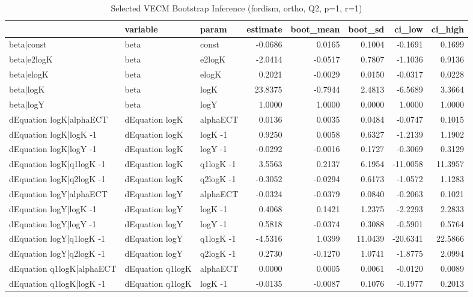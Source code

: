 \begin{table}[!h]
\centering
\caption{Selected VECM Bootstrap Inference (fordism, ortho, Q2, p=1, r=1)}
\centering
\fontsize{9}{11}\selectfont
\begin{tabular}[t]{lllrrrrr}
\toprule
  & variable & param & estimate & boot_mean & boot_sd & ci_low & ci_high\\
\midrule
beta|const & beta & const & -0.0686 & 0.0165 & 0.1004 & -0.1691 & 0.1699\\
beta|e2logK & beta & e2logK & -2.0414 & -0.0517 & 0.7807 & -1.1036 & 0.9136\\
beta|elogK & beta & elogK & 0.2021 & -0.0029 & 0.0150 & -0.0317 & 0.0228\\
beta|logK & beta & logK & 23.8375 & -0.7944 & 2.4813 & -6.5689 & 3.3664\\
beta|logY & beta & logY & 1.0000 & 1.0000 & 0.0000 & 1.0000 & 1.0000\\
\addlinespace
dEquation logK|alphaECT & dEquation logK & alphaECT & 0.0136 & 0.0035 & 0.0484 & -0.0747 & 0.1015\\
dEquation logK|logK -1 & dEquation logK & logK -1 & 0.9250 & 0.0058 & 0.6327 & -1.2139 & 1.1902\\
dEquation logK|logY -1 & dEquation logK & logY -1 & -0.0292 & -0.0016 & 0.1727 & -0.3069 & 0.3129\\
dEquation logK|q1logK -1 & dEquation logK & q1logK -1 & 3.5563 & 0.2137 & 6.1954 & -11.0058 & 11.3957\\
dEquation logK|q2logK -1 & dEquation logK & q2logK -1 & -0.3052 & -0.0294 & 0.6173 & -1.0572 & 1.1283\\
\addlinespace
dEquation logY|alphaECT & dEquation logY & alphaECT & -0.0324 & -0.0379 & 0.0840 & -0.2063 & 0.1021\\
dEquation logY|logK -1 & dEquation logY & logK -1 & 0.4068 & 0.1421 & 1.2375 & -2.2293 & 2.2833\\
dEquation logY|logY -1 & dEquation logY & logY -1 & 0.5818 & -0.0374 & 0.3088 & -0.5901 & 0.5764\\
dEquation logY|q1logK -1 & dEquation logY & q1logK -1 & -4.5316 & 1.0399 & 11.0439 & -20.6341 & 22.5866\\
dEquation logY|q2logK -1 & dEquation logY & q2logK -1 & 0.2730 & -0.1270 & 1.0741 & -1.8775 & 2.0994\\
\addlinespace
dEquation q1logK|alphaECT & dEquation q1logK & alphaECT & 0.0000 & 0.0005 & 0.0061 & -0.0120 & 0.0089\\
dEquation q1logK|logK -1 & dEquation q1logK & logK -1 & -0.0135 & -0.0087 & 0.1076 & -0.1977 & 0.2013\\

\end{tabular}
\end{table}
